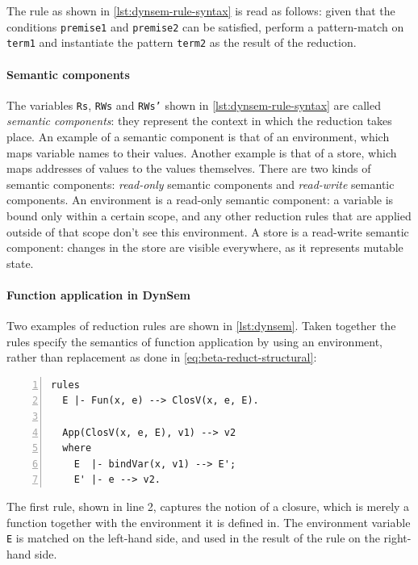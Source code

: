 The rule as shown in \cref{lst:dynsem-rule-syntax} is read as follows: given
that the conditions \texttt{premise1} and \texttt{premise2} can be satisfied,
perform a pattern-match on \texttt{term1} and instantiate the pattern
\texttt{term2} as the result of the reduction.

\paragraph{Semantic components} The variables \texttt{Rs}, \texttt{RWs} and
\texttt{RWs'} shown in \cref{lst:dynsem-rule-syntax} are called \textit{semantic
  components}: they represent the context in which the reduction takes place. An
example of a semantic component is that of an environment, which maps variable
names to their values. Another example is that of a store, which maps addresses
of values to the values themselves. There are two kinds of semantic components:
\textit{read-only} semantic components and \textit{read-write} semantic
components. An environment is a read-only semantic component: a variable is
bound only within a certain scope, and any other reduction rules that are
applied outside of that scope don't see this environment. A store is a
read-write semantic component: changes in the store are visible everywhere, as
it represents mutable state.

\paragraph{Function application in DynSem} Two examples of reduction rules are
shown in \cref{lst:dynsem}. Taken together the rules specify the semantics of
function application by using an environment, rather than replacement as done in
\cref{eq:beta-reduct-structural}:

\begin{minipage}[t]{\linewidth}
\begin{lstlisting}[language=dynsem,numbers=left,caption={Specifying function
application through the use of an environment.},label={lst:dynsem}]
rules
  E |- Fun(x, e) --> ClosV(x, e, E).

  App(ClosV(x, e, E), v1) --> v2
  where
    E  |- bindVar(x, v1) --> E';
    E' |- e --> v2.
\end{lstlisting}
\end{minipage}

The first rule, shown in line 2, captures the notion of a closure, which is
merely a function together with the environment it is defined in. The
environment variable \texttt{E} is matched on the left-hand side, and used in
the result of the rule on the right-hand side.

